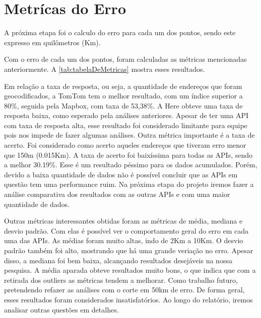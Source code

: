 \section{Metrícas do Erro}
A próxima etapa foi o calculo do erro para cada um dos pontos, sendo este expresso em quilômetros (Km).

Com o erro de cada um dos pontos, foram calculadas as métricas mencionadas anteriormente. A \ref{tab:tabelaDeMetricas} mostra esses resultados.

Em relação a taxa de resposta, ou seja, a quantidade de endereços que foram geocodificados, a TomTom tem o melhor resultado, com um índice superior a 80\%, seguida pela Mapbox, com taxa de 53,38\%. A Here obteve uma taxa de resposta baixa, como esperado pela análises anteriores. Apesar de ter uma API com taxa de resposta alta, esse resultado foi considerado limitante para equipe pois nos impede de fazer algumas análises.
Outra métrica importante é a taxa de acerto. Foi considerado como acerto aqueles endereços que tiveram erro menor que 150m (0.015Km). A taxa de acerto foi baixíssima para todas as APIs, sendo a melhor 30.19\%. Esse é um resultado péssimo para os dados acumulados. Porém, devido a baixa quantidade de dados não é possível concluir que as APIs em questão tem uma performance ruim. Na próxima etapa do projeto iremos fazer a análise comparativa dos resultados com as outras APIs e com uma maior quantidade de dados. 

Outras métricas interessantes obtidas foram as métricas de média, mediana e desvio padrão. Com elas é possível ver o comportamento geral do erro em cada uma das APIs. As médias foram muito altas, indo de 2Km a 10Km. O desvio padrão também foi alto, mostrando que há uma grande veriação no erro. Apesar disso, a mediana foi bem baixa, alcançando resultados desejáveis na nossa pesquisa. A média aparada obteve resultados muito bons, o que indica que com a retirada dos outliers as métricas tendem a melhorar. Como trabalho futuro, pretendendo refazer as análises com o corte em 50km de erro. De forma geral, esses resultados foram considerados insatisfatórios. Ao longo do relatório, iremos analisar outras questões em detalhes.


